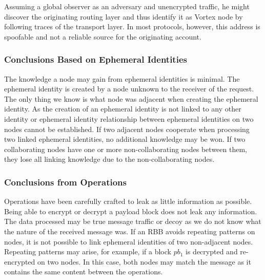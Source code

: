 \documentclass[10pt,journal,compsoc,twocolumn,twoside]{IEEEtran}
\begin{document}
Assuming a global observer as an adversary and unencrypted traffic, he might discover the originating routing layer and thus identify it as Vortex node by following traces of the transport layer. In most protocols, however, this address is spoofable and not a reliable source for the originating account.

\subsubsection{Conclusions Based on Ephemeral Identities}
The knowledge a node may gain from ephemeral identities is minimal. The ephemeral identity is created by a node unknown to the receiver of the request. The only thing we know is what node was adjacent when creating the ephemeral identity. As the creation of an ephemeral identity is not linked to any other identity or ephemeral identity relationship between ephemeral identities on two nodes cannot be established. If two adjacent nodes cooperate when processing two linked ephemeral identities, no additional knowledge may be won. If two collaborating nodes have one or more non-collaborating nodes between them, they lose all linking knowledge due to the non-collaborating nodes. 

\subsubsection{Conclusions from Operations}
Operations have been carefully crafted to leak as little information as possible. Being able to encrypt or decrypt a payload block does not leak any information. The data processed may be true message traffic or decoy as we do not know what the nature of the received message was. If an RBB avoids repeating patterns on nodes, it is not possible to link ephemeral identities of two non-adjacent nodes. Repeating patterns may arise, for example, if a block $pb_1$ is decrypted and re-encrypted on two nodes. In this case, both nodes may match the message as it contains the same content between the operations.
\end{document}
